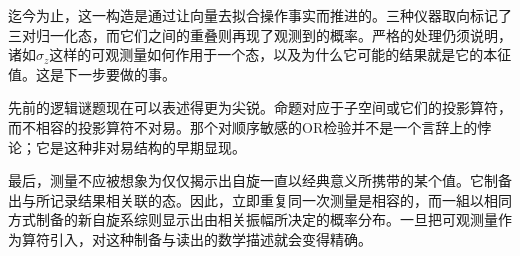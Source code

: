 迄今为止，这一构造是通过让向量去拟合操作事实而推进的。三种仪器取向标记了三对归一化态，而它们之间的重叠则再现了观测到的概率。严格的处理仍须说明，诸如\(\sigma_z\)这样的可观测量如何作用于一个态，以及为什么它可能的结果就是它的本征值。这是下一步要做的事。

先前的逻辑谜题现在可以表述得更为尖锐。命题对应于子空间或它们的投影算符，而不相容的投影算符不对易。那个对顺序敏感的OR检验并不是一个言辞上的悖论；它是这种非对易结构的早期显现。

\begin{classroomqa}
\end{classroomqa}

\begin{classroomqa}
\end{classroomqa}

最后，测量不应被想象为仅仅揭示出自旋一直以经典意义所携带的某个值。它制备出与所记录结果相关联的态。因此，立即重复同一次测量是相容的，而一組以相同方式制备的新自旋系综则显示出由相关振幅所决定的概率分布。一旦把可观测量作为算符引入，对这种制备与读出的数学描述就会变得精确。
